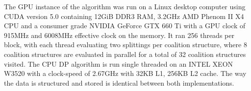 \documentclass{llncs}
\begin{document}
The GPU instance of the algorithm was run on a Linux desktop computer using CUDA version 5.0 containing 12GiB DDR3 RAM,  3.2GHz AMD Phenom II X4 CPU and a consumer grade NVIDIA GeForce GTX 660 Ti with a GPU clock of 915MHz and 6008MHz effective clock on the memory.
It ran 256 threads per block, with each thread evaluating two splittings per coalition structure, 
where 8 coalition structures are evaluated in parallel for a total of 32 coalition structures visited.
The CPU DP algorithm is run single threaded on an INTEL XEON W3520 with a clock-speed of 2.67GHz with 32KB L1, 256KB L2 cache.  The way the data is structured and stored is identical between both implementations.

%
\end{document}
